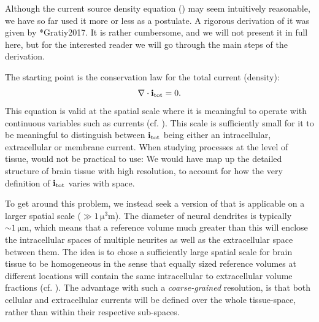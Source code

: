 \subsubsection{}
\label{sec:VC:C2}
Although the current source density equation () may seem intuitively reasonable, we have so far used it more or less as a postulate. A rigorous derivation of it was given by \citeasnoun**{Gratiy2017}. It is rather cumbersome, and we will not present it in full here, but for the interested reader we will go through the main steps of the derivation. 

The starting point is the conservation law for the total current (density):
\begin{equation}
{\bf \nabla} \cdot {\bf i}_\text{tot} = 0.
\label{eq:VC:Sergey1}
\end{equation}
This equation is valid at the spatial scale where it is meaningful to operate with continuous variables such as currents (cf. ). This scale is sufficiently small for it to be meaningful to distinguish between ${\bf i}_\text{tot}$ being either an intracellular, extracellular or membrane current. When studying processes at the level of tissue,  would not be practical to use: We would have map up the detailed structure of brain tissue with high resolution, to account for how the very definition of ${\bf i}_\text{tot}$ varies with space. 

To get around this problem, we instead seek a version of  that is applicable on a larger spatial scale ($\gg 1 \, \si{\cubic\micro\metre}$). The diameter of neural dendrites is typically $\sim 1 \,\si{\micro\metre}$, which means that a reference volume much greater than this will enclose the intracellular spaces of multiple neurites as well as the extracellular space between them. The idea is to chose a sufficiently large spatial scale for brain tissue to be homogeneous in the sense that equally sized reference volumes at different locations will contain the same intracellular to extracellular volume fractions (cf. ). The advantage with such a \textit{coarse-grained} resolution, is that both cellular and extracellular currents will be defined over the whole tissue-space, rather than within their respective sub-spaces.

